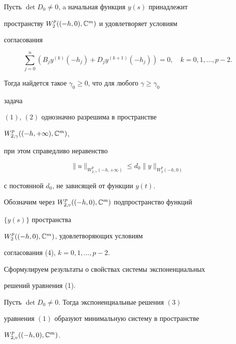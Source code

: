 \begin{lem} 


Пусть $\det D_0\ne0$, a начальная функция $y(s)$ принадлежит 


пространству $W^p_{2}((-h,0),\Bbb C^m)$ и удовлетворяет условиям 


согласования


\begin{equation} 


\sum^n_{j=0}(B_j y^{(k)}(-h_j)+D_j y^{(k+1)}(-h_j))=0,\quad 


k=0,1,\dotsc,p-2. 


\end{equation} 


Тогда найдется такое $\gamma_0\ge0$, что для любого $\gamma\ge\gamma_0$ 


задача 


$(1)$, $(2)$ однозначно разрешима в пространстве 


$W^p_{2,\gamma}((-h,+\infty),\Bbb C^m)$, 


при этом справедливо неравенство 


$$


\|u\|_{W^p_{2,\gamma}(-h,+\infty)}\le d_0 


\|y\|_{W^p_2(-h,0)} 


$$


с постоянной $d_0$, не зависящей от функции $y(t)$. 


\end{lem} 


 


Обозначим через $W^p_{2,v}((-h,0),\Bbb C^m)$ подпространство функций 


$\{y(s)\}$ пространства \linebreak


$W^p_{2}((-h,0),\Bbb C^m)$, удовлетворяющих условиям 


согласования (4), $k=0,1,\dotsc,p-2$. 


 


Сформулируем результаты о свойствах системы экспоненциальных 


решений уравнения (1). 


 


\begin{prop} 


Пусть $\det D_0\ne0$. Тогда экспоненциальные решения $(3)$ 


уравнения $(1)$ образуют минимальную систему в пространстве 


$W^p_{2,v}((-h,0),\Bbb C^m)$. 


\end{prop} 


